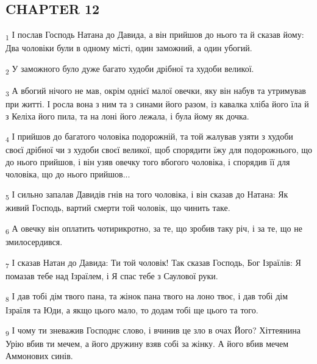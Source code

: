 \subsection{CHAPTER 12}
\begin{tcolorbox}
\textsubscript{1} І послав Господь Натана до Давида, а він прийшов до нього та й сказав йому: Два чоловіки були в одному місті, один заможний, а один убогий.
\end{tcolorbox}
\begin{tcolorbox}
\textsubscript{2} У заможного було дуже багато худоби дрібної та худоби великої.
\end{tcolorbox}
\begin{tcolorbox}
\textsubscript{3} А вбогий нічого не мав, окрім однієї малої овечки, яку він набув та утримував при житті. І росла вона з ним та з синами його разом, із кавалка хліба його їла й з Келіха його пила, та на лоні його лежала, і була йому як дочка.
\end{tcolorbox}
\begin{tcolorbox}
\textsubscript{4} І прийшов до багатого чоловіка подорожній, та той жалував узяти з худоби своєї дрібної чи з худоби своєї великої, щоб спорядити їжу для подорожнього, що до нього прийшов, і він узяв овечку того вбогого чоловіка, і спорядив її для чоловіка, що до нього прийшов...
\end{tcolorbox}
\begin{tcolorbox}
\textsubscript{5} І сильно запалав Давидів гнів на того чоловіка, і він сказав до Натана: Як живий Господь, вартий смерти той чоловік, що чинить таке.
\end{tcolorbox}
\begin{tcolorbox}
\textsubscript{6} А овечку він оплатить чотирикротно, за те, що зробив таку річ, і за те, що не змилосердився.
\end{tcolorbox}
\begin{tcolorbox}
\textsubscript{7} І сказав Натан до Давида: Ти той чоловік! Так сказав Господь, Бог Ізраїлів: Я помазав тебе над Ізраїлем, і Я спас тебе з Саулової руки.
\end{tcolorbox}
\begin{tcolorbox}
\textsubscript{8} І дав тобі дім твого пана, та жінок пана твого на лоно твоє, і дав тобі дім Ізраїля та Юди, а якщо цього мало, то додам тобі ще цього та того.
\end{tcolorbox}
\begin{tcolorbox}
\textsubscript{9} І чому ти зневажив Господнє слово, і вчинив це зло в очах Його? Хіттеянина Урію вбив ти мечем, а його дружину взяв собі за жінку. А його вбив мечем Аммонових синів.
\end{tcolorbox}
